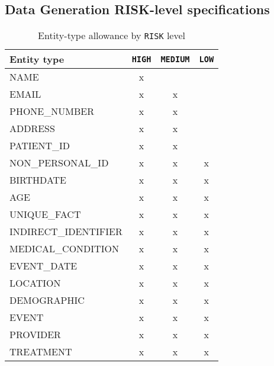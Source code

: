 \subsection*{Data Generation RISK-level specifications}\label{appendixB:risk-specifications}
\begin{table}[h]
\centering
\caption{Entity-type allowance by \texttt{RISK} level}
\label{appendixB:risk-specification-entity-matrix}
\renewcommand{\arraystretch}{1.1}
\begin{tabular}{|l|c|c|c|}
\hline
\textbf{Entity type} & \texttt{HIGH} & \texttt{MEDIUM} & \texttt{LOW} \\
\hline
NAME                 & x &   &   \\
EMAIL                & x & x &   \\
PHONE\_NUMBER        & x & x &   \\
ADDRESS              & x & x &   \\
PATIENT\_ID          & x & x &   \\
NON\_PERSONAL\_ID    & x & x & x \\
BIRTHDATE            & x & x & x \\
AGE                  & x & x & x \\
UNIQUE\_FACT         & x & x & x \\
INDIRECT\_IDENTIFIER & x & x & x \\
MEDICAL\_CONDITION   & x & x & x \\
EVENT\_DATE          & x & x & x \\
LOCATION             & x & x & x \\
DEMOGRAPHIC          & x & x & x \\
EVENT                & x & x & x \\
PROVIDER             & x & x & x \\
TREATMENT            & x & x & x \\
\hline
\end{tabular}
\end{table}


